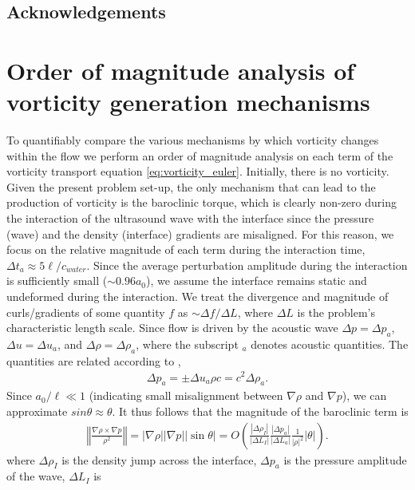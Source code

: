 \documentclass{jfm}%
\newcommand{\orderof}[1]{\ensuremath{\textit{O}\left(#1\right)}}
\newcommand{\abs}[1]{\ensuremath{\left|#1\right|}}
\newcommand{\norm}[1]{\ensuremath{\left\Vert#1\right\Vert}}
\begin{document}
\subsection*{Acknowledgements}

\appendix
\section{Order of magnitude analysis of vorticity generation mechanisms}
\label{sec:oom_analysis}
To quantifiably compare the various mechanisms by which vorticity
changes within the flow we perform an order of magnitude analysis on
each term of the vorticity transport equation
\eqref{eq:vorticity_euler}. Initially, there is no vorticity. Given
the present problem set-up, the only mechanism that can lead to the
production of vorticity is the baroclinic torque, which is clearly
non-zero during the interaction of the ultrasound wave with the
interface since the pressure (wave) and the density (interface)
gradients are misaligned. For this reason, we focus on the relative
magnitude of each term during the interaction time,
$\Delta t_a \approx 5\ell/c_{water}$. Since the average perturbation
amplitude during the interaction is sufficiently small
($\sim 0.96a_0$), we assume the interface remains static and
undeformed during the interaction. We treat the divergence and
magnitude of curls/gradients of some quantity $f$ as
$\sim \Delta f/ \Delta L$, where $\Delta L$ is the problem's
characteristic length scale. Since flow is driven by the acoustic wave
$\Delta p=\Delta p_a$,
$\Delta u=\Delta u_a$, and
$\Delta \rho=\Delta \rho_a$, where the subscript $_a$ denotes acoustic
quantities. The quantities are related according to \citep{Anderson1990},
\begin{align}%
  \label{eq:acoustic_relations}%
  \Delta p_a=\pm\Delta u_a \rho c=c^2\Delta \rho_a.%
\end{align}
Since $a_0/\ell\ll 1$ (indicating small misalignment between
$\nabla \rho$ and $\nabla p$), we can approximate
$sin \theta \approx \theta$. It thus follows that the magnitude of the
baroclinic term is
\begin{align}
  \label{eq:baroclinic_vorticity}%
  \norm{\frac{\nabla\rho\times\nabla p}{\rho^2}} =%
  |\nabla \rho||\nabla p||\sin\theta|=
  \orderof{\frac{\abs{\Delta \rho_I}}{\abs{\Delta L_I}}\frac{\abs{\Delta p_a}}{\abs{\Delta L_a}}\frac{1}{\abs{\rho}^2}\abs{\theta}}.%
\end{align}
where $\Delta \rho_I$ is the density jump across the interface,
$\Delta p_a$ is the pressure amplitude of the wave, $\Delta L_I$ is
\end{document}
